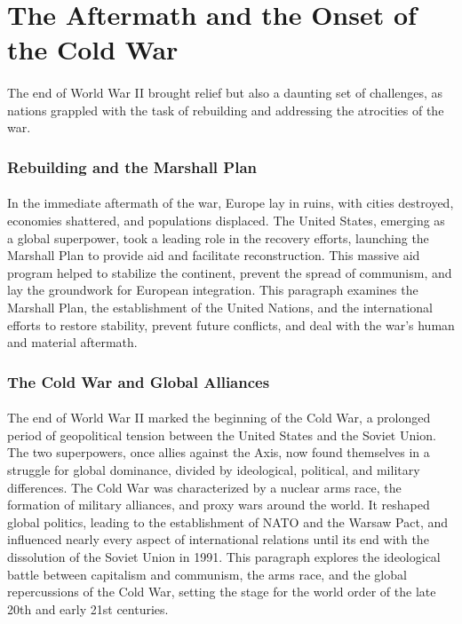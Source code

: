 \documentclass[a4paper,12pt]{book}
\begin{document}
\section*{The Aftermath and the Onset of the Cold War}
\paragraph{}
The end of World War II brought relief but also a daunting set of challenges, as nations grappled with the task of rebuilding and addressing the atrocities of the war.

\subsubsection*{Rebuilding and the Marshall Plan}
\paragraph{}
In the immediate aftermath of the war, Europe lay in ruins, with cities destroyed, economies shattered, and populations displaced. The United States, emerging as a global superpower, took a leading role in the recovery efforts, launching the Marshall Plan to provide aid and facilitate reconstruction. This massive aid program helped to stabilize the continent, prevent the spread of communism, and lay the groundwork for European integration. This paragraph examines the Marshall Plan, the establishment of the United Nations, and the international efforts to restore stability, prevent future conflicts, and deal with the war’s human and material aftermath.

\subsubsection*{The Cold War and Global Alliances}
\paragraph{}
The end of World War II marked the beginning of the Cold War, a prolonged period of geopolitical tension between the United States and the Soviet Union. The two superpowers, once allies against the Axis, now found themselves in a struggle for global dominance, divided by ideological, political, and military differences. The Cold War was characterized by a nuclear arms race, the formation of military alliances, and proxy wars around the world. It reshaped global politics, leading to the establishment of NATO and the Warsaw Pact, and influenced nearly every aspect of international relations until its end with the dissolution of the Soviet Union in 1991. This paragraph explores the ideological battle between capitalism and communism, the arms race, and the global repercussions of the Cold War, setting the stage for the world order of the late 20th and early 21st centuries.
\end{document}
